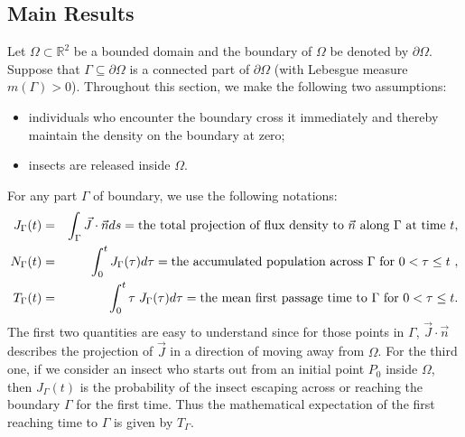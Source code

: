 \documentclass[11pt]{article}
\newcommand{\bean}{\begin{eqnarray*}}
\newcommand{\eean}{\end{eqnarray*}}
\newcommand{\Real}{\mathbb R}
\begin{document}
\subsection{Main Results}
Let $\Omega\subset \Real^2$ be a bounded domain and the boundary of $\Omega$ be denoted by $\partial \Omega$. Suppose that $\Gamma \subseteq \partial \Omega$ is a connected part of $\partial \Omega$ (with Lebesgue measure $m(\Gamma)>0$). Throughout this section, we make the following two assumptions:
\begin{itemize}
  \item individuals who encounter the boundary cross it immediately and thereby maintain the density on the boundary at zero;
  \item insects are released inside $\Omega$. 
\end{itemize}  
For any part $\Gamma$ of boundary, we use the following notations: 
\bean
J_\Gamma(t)&=& \int_{\Gamma}\vec{J}\cdot\vec{n}ds=\hbox{the total projection of flux density to $\vec{n}$ along $\Gamma$ at time $t$},\\
N_{\Gamma}(t)&=&\int_0^t J_{\Gamma}(\tau)d\tau=\hbox{the accumulated population  across $\Gamma$ for $0<\tau \le t$ },\\
T_{\Gamma}(t) &=&\int_0^{t} \tau\;J_\Gamma(\tau)d\tau=\hbox{the mean first passage time to $\Gamma$  for $0<\tau \le t$}.
\eean
The first two quantities are easy to understand since for those points in $\Gamma$, $\vec{J}\cdot \vec{n}$ describes  the projection of $\vec{J}$ in a direction of moving away from $\Omega$. For the third one, if we consider an insect who starts out from an initial point $P_0$ inside $\Omega$, then $J_{\Gamma}(t)$ is the probability of the insect escaping across or reaching the boundary $\Gamma$ for the first time. Thus the mathematical expectation of the first reaching time to $\Gamma$ is given by $T_{\Gamma}$. 
\end{document}
